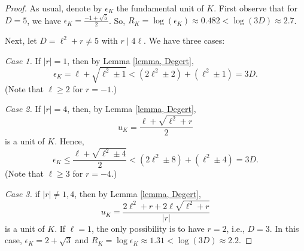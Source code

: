 \documentclass[12pt]{amsart}
\theoremstyle{definition}
\numberwithin{equation}{section}
\begin{document}
 
 \begin{proof} 	
 As usual, denote by $\epsilon_K$ the fundamental unit of $K$. First observe that for $D=5$, we have $\epsilon_K=\frac{-1+\sqrt{5}}{2}$. So, $	R_K=\log\left( \epsilon_K \right) \approx 0.482 < \log(3 D) \approx 2.7$.


Next, let $D=\ell^2+r \neq 5$ with $r \mid 4\ell$.  
We have three cases:

	
\noindent 	
\textit{Case 1.} If $|r|=1$, then by Lemma \ref{lemma, Degert}, 
 		\begin{equation*}
 			\epsilon_K =\ell + \sqrt{\ell^2 \pm 1} < \left(2\ell^2 \pm 2\right)+\left(\ell^2 \pm 1\right)=3D.
 		\end{equation*}
 (Note that $\ell \geq 2$ for $r=-1$.)
 	 
\noindent
\textit{Case 2.} If $|r|=4$, then, by Lemma \ref{lemma, Degert},
	\begin{equation*}
		u_K=\frac{	\ell + \sqrt{\ell^2+r}}{2}
	\end{equation*}
	is a unit of $K$. 
		Hence, 
	\begin{equation*}
		\epsilon_K \leq 	\frac{	\ell + \sqrt{\ell^2 \pm 4}}{2} 	< \left(2 \ell^2\pm 8\right) + \left(\ell^2\pm 4\right)=3D.
	\end{equation*}
	(Note that $\ell \geq 3$ for $r=-4$.)

\noindent 
\textit{Case 3.} if $|r| \neq 1,4$, then by Lemma \ref{lemma, Degert}, 
	\begin{equation*}
		u_K=\frac{	2\ell^2+r + 2 \ell \sqrt{\ell^2+r}}{|r|}
	\end{equation*}
 	is a unit of $K$. If $\ell=1$, the only possibility is to have $r=2$, i.e., $D=3$. In this case, $\epsilon_K=2+\sqrt{3}$ and $	R_K=\log{\epsilon_{K}} \approx 1.31 < \log (3D) \approx 2.2$.


\end{proof}
\end{document}
